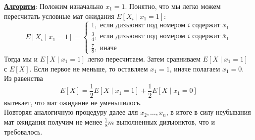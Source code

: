 \documentclass[11pt]{article}
\begin{document}
\underline{\textbf{Алгоритм}}: Положим изначально $x_1 = 1$. Понятно, что мы легко можем пересчитать условные мат ожидания $E[X_i \; | \; x_1 = 1]$:
\begin{equation*}
    E[X_i \; | \; x_1 = 1] = 
    \begin{cases}
        1, \text{ если дизъюнкт под номером } i \text{ содержит } x_1 \\
        \frac{3}{4}, \text{ если дизъюнкт под номером } i \text{ содержит } \overline{x}_1 \\
        \frac{7}{8}, \text{ иначе}
    \end{cases}
\end{equation*}
Тогда мы и $E[X \; | \; x_1 = 1]$ легко пересчитаем. Затем сравниваем $E[X \; | \; x_1 = 1]$ с $E[X]$. Если первое не меньше, то оставляем $x_1 = 1$, иначе полагаем $x_1 = 0$.
Из равенства
\[E[X] = \frac{1}{2} E[X \; | \; x_1 = 1] + \frac{1}{2} E[X \; | \; x_1 = 0]\]
вытекает, что мат ожидание не уменьшилось. \\
Повторяя аналогичную процедуру далее для $x_2, \ldots, x_n$, в итоге в силу неубывания мат ожидания получим не менее $\frac{7}{8}m$ выполненных дизъюнктов, что и требовалось.
\end{document}
